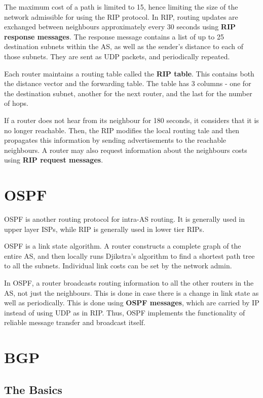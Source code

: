 \documentclass[12pt,letterpaper]{book}
\theoremstyle{definition}
\begin{document}
The maximum cost of a path is limited to 15, hence limiting the size of the network admissible for using the RIP protocol.  In RIP, routing updates are exchanged between neighbours approximately every 30 seconds using \textbf{RIP response messages}. The response message contains a list of up to 25 destination subnets within the AS, as well as the sender's distance to each of those subnets. They are sent as UDP packets, and periodically repeated.

Each router maintains a routing table called the \textbf{RIP table}. This contains both the distance vector and the forwarding table. The table has 3 columns - one for the destination subnet, another for the next router, and the last for the number of hops.

If a router does not hear from its neighbour for 180 seconds, it considers that it is no longer reachable. Then, the RIP modifies the local routing tale and then propagates this information by sending advertisements to the reachable neighbours. A router may also request information about the neighbours costs using \textbf{RIP request messages}.

\section{OSPF}

OSPF is another routing protocol for intra-AS routing. It is generally used in upper layer ISPs, while RIP is generally used in lower tier RIPs.

OSPF is a link state algorithm. A router constructs a complete graph of the entire AS, and then locally runs Djikstra's algorithm to find a shortest path tree to all the subnets. Individual link costs can be set by the network admin.

In OSPF, a router broadcasts routing information to all the other routers in the AS, not just the neighbours. This is done in case there is a change in link state as well as periodically. This is done using \textbf{OSPF messages}, which are carried by IP instead of using UDP as in RIP. Thus, OSPF implements the functionality of reliable message transfer and broadcast itself.

\section{BGP}

\subsection{The Basics}
\end{document}

